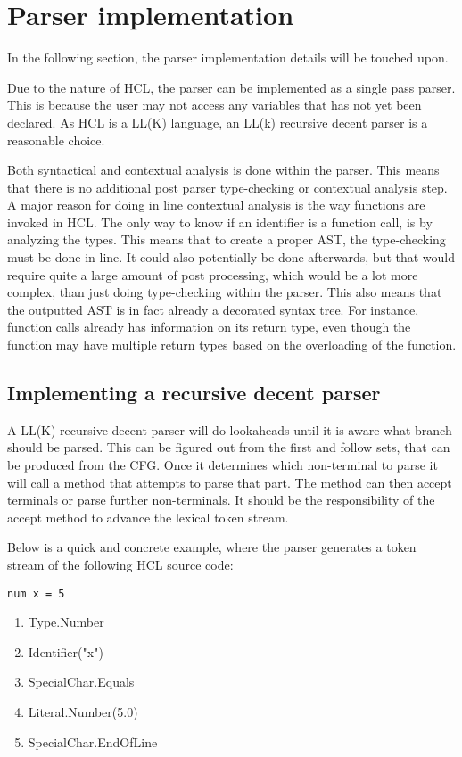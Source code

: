 \section{Parser implementation}
\label{parserImplemention}
In the following section, the parser implementation details will be touched upon.

Due to the nature of HCL, the parser can be implemented as a single pass parser. 
This is because the user may not access any variables that has not yet been declared. 
As HCL is a LL(K) language, an LL(k) recursive decent parser is a reasonable choice.

Both syntactical and contextual analysis is done within the parser. 
This means that there is no additional post parser type-checking or contextual analysis step. 
A major reason for doing in line contextual analysis is the way functions are invoked in HCL. 
The only way to know if an identifier is a function call, is by analyzing the types. 
This means that to create a proper AST, the type-checking must be done in line. 
It could also potentially be done afterwards, but that would require quite a large amount of post processing, which would be a lot more complex, than just doing type-checking within the parser. 
This also means that the outputted AST is in fact already a decorated syntax tree. 
For instance, function calls already has information on its return type, even though the function may have multiple return types based on the overloading of the function.

\subsection{Implementing a recursive decent parser}
A LL(K) recursive decent parser will do lookaheads until it is aware what branch should be parsed.
This can be figured out from the first and follow sets, that can be produced from the CFG.
Once it determines which non-terminal to parse it will call a method that attempts to parse that part.
The method can then accept terminals or parse further non-terminals.
It should be the responsibility of the accept method to advance the lexical token stream.

Below is a quick and concrete example, where the parser generates a token stream of the following HCL source code:
\begin{lstlisting}[language=HCL,label=lis:typedclsParserNum,firstnumber=1]
num x = 5
\end{lstlisting}

\begin{enumerate}
	\item Type.Number
	\item Identifier("x")
	\item SpecialChar.Equals
	\item Literal.Number(5.0)
	\item SpecialChar.EndOfLine
\end{enumerate}


